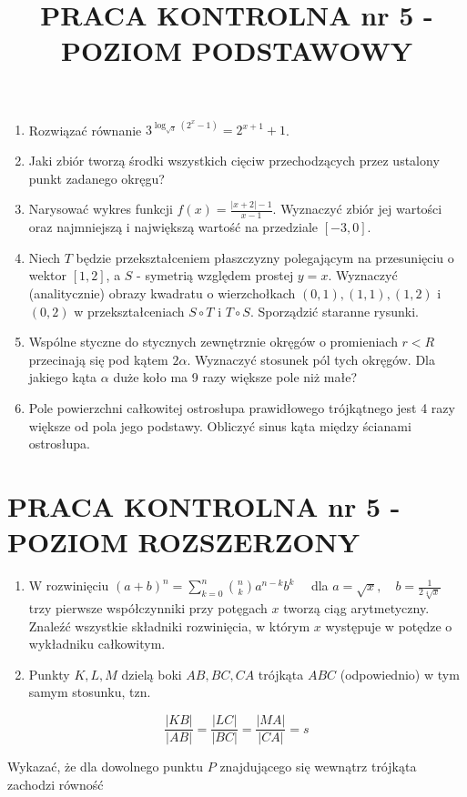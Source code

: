 \documentclass[10pt]{article}
\title{PRACA KONTROLNA nr 5 - POZIOM PODSTAWOWY }
\author{}
\date{}
\begin{document}
\maketitle
\begin{enumerate}
  \item Rozwiązać równanie $3^{\log _{\sqrt{3}}\left(2^{x}-1\right)}=2^{x+1}+1$.
  \item Jaki zbiór tworzą środki wszystkich cięciw przechodzących przez ustalony punkt zadanego okręgu?
  \item Narysować wykres funkcji $f(x)=\frac{|x+2|-1}{x-1}$. Wyznaczyć zbiór jej wartości oraz najmniejszą i największą wartość na przedziale $[-3,0]$.
  \item Niech $T$ będzie przekształceniem płaszczyzny polegającym na przesunięciu o wektor $[1,2]$, a $S$ - symetrią względem prostej $y=x$. Wyznaczyć (analitycznie) obrazy kwadratu o wierzchołkach $(0,1),(1,1),(1,2)$ i $(0,2)$ w przekształceniach $S \circ T$ i $T \circ S$. Sporządzić staranne rysunki.
  \item Wspólne styczne do stycznych zewnętrznie okręgów o promieniach $r<R$ przecinają się pod kątem $2 \alpha$. Wyznaczyć stosunek pól tych okręgów. Dla jakiego kąta $\alpha$ duże koło ma 9 razy większe pole niż małe?
  \item Pole powierzchni całkowitej ostrosłupa prawidłowego trójkątnego jest 4 razy większe od pola jego podstawy. Obliczyć sinus kąta między ścianami ostrosłupa.
\end{enumerate}

\section*{PRACA KONTROLNA nr 5 - POZIOM ROZSZERZONY}
\begin{enumerate}
  \item W rozwinięciu $(a+b)^{n}=\sum_{k=0}^{n}\binom{n}{k} a^{n-k} b^{k} \quad$ dla $a=\sqrt{x}, \quad b=\frac{1}{2 \sqrt[4]{x}} \quad$ trzy pierwsze współczynniki przy potęgach $x$ tworzą ciąg arytmetyczny. Znaleźć wszystkie składniki rozwinięcia, w którym $x$ występuje w potędze o wykładniku całkowitym.
  \item Punkty $K, L, M$ dzielą boki $A B, B C, C A$ trójkąta $A B C$ (odpowiednio) w tym samym stosunku, tzn.
\end{enumerate}

$$
\frac{|K B|}{|A B|}=\frac{|L C|}{|B C|}=\frac{|M A|}{|C A|}=s
$$

Wykazać, że dla dowolnego punktu $P$ znajdującego się wewnątrz trójkąta zachodzi równość
\end{document}

